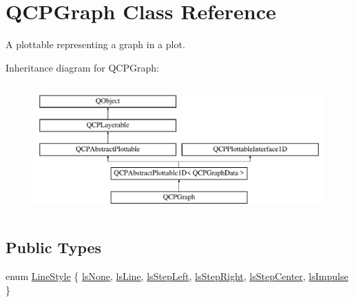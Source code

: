 \hypertarget{class_q_c_p_graph}{}\section{Q\+C\+P\+Graph Class Reference}
\label{class_q_c_p_graph}


A plottable representing a graph in a plot.  


Inheritance diagram for Q\+C\+P\+Graph\+:\begin{figure}[H]
\begin{center}
\leavevmode
\includegraphics[height=5.000000cm]{class_q_c_p_graph}
\end{center}
\end{figure}
\subsection*{Public Types}
\begin{DoxyCompactItemize}
\item 
enum \hyperlink{class_q_c_p_graph_ad60175cd9b5cac937c5ee685c32c0859}{Line\+Style} \{ \newline
\hyperlink{class_q_c_p_graph_ad60175cd9b5cac937c5ee685c32c0859aea9591b933733cc7b20786b71e60fa04}{ls\+None}, 
\hyperlink{class_q_c_p_graph_ad60175cd9b5cac937c5ee685c32c0859a3c42a27b15aa3c92d399082fad8b7515}{ls\+Line}, 
\hyperlink{class_q_c_p_graph_ad60175cd9b5cac937c5ee685c32c0859ae10568bda57836487d9dec5eba1d6c6e}{ls\+Step\+Left}, 
\hyperlink{class_q_c_p_graph_ad60175cd9b5cac937c5ee685c32c0859a9c37951f7d11aa070100fd16f2935c9e}{ls\+Step\+Right}, 
\newline
\hyperlink{class_q_c_p_graph_ad60175cd9b5cac937c5ee685c32c0859a5adf7b04da215a40a764c21294ea7366}{ls\+Step\+Center}, 
\hyperlink{class_q_c_p_graph_ad60175cd9b5cac937c5ee685c32c0859aa3b358b4ae7cca94aceeb8e529c12ebb}{ls\+Impulse}
 \}
\end{DoxyCompactItemize}
